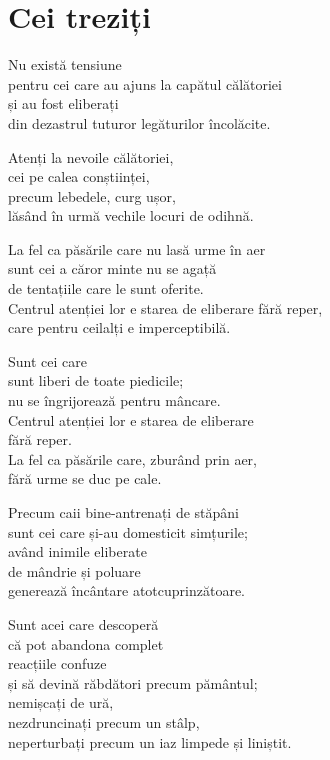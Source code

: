 
\chapter{Cei treziți}


Nu există tensiune\\
pentru cei care au ajuns la capătul călătoriei\\
și au fost eliberați\\
din dezastrul tuturor legăturilor încolăcite.


Atenți la nevoile călătoriei,\\
cei pe calea conștiinței,\\
precum lebedele, curg ușor,\\
lăsând în urmă vechile locuri de odihnă.


La fel ca păsările care nu lasă urme în aer\\
sunt cei a căror minte nu se agață\\
de tentațiile care le sunt oferite.\\
Centrul atenției lor e starea de eliberare fără reper,\\
care pentru ceilalți e imperceptibilă.


Sunt cei care\\
sunt liberi de toate piedicile;\\
nu se îngrijorează pentru mâncare.\\
Centrul atenției lor e starea de eliberare\\
fără reper.\\
La fel ca păsările care, zburând prin aer,\\
fără urme se duc pe cale.


Precum caii bine-antrenați de stăpâni\\
sunt cei care și-au domesticit simțurile;\\
având inimile eliberate\\
de mândrie și poluare\\
generează încântare atotcuprinzătoare.


Sunt acei care descoperă\\
că pot abandona complet\\
reacțiile confuze\\
și să devină răbdători precum pământul;\\
nemișcați de ură,\\
nezdruncinați precum un stâlp,\\
neperturbați precum un iaz limpede și liniștit.


